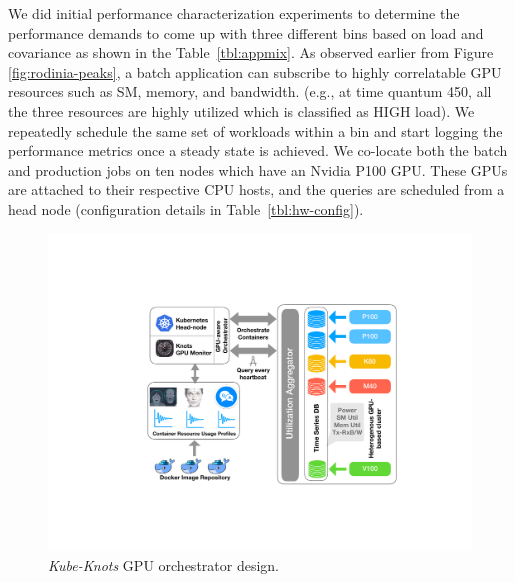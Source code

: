 We did initial performance characterization experiments to determine the performance demands to come up with three different bins based on load and covariance as shown in the Table~\ref{tbl:appmix}. As observed earlier from Figure \ref{fig:rodinia-peaks}, a batch application can subscribe to highly correlatable GPU resources such as SM, memory, and bandwidth. (e.g., at time quantum 450, all the three resources are highly utilized which is classified as HIGH load). We repeatedly schedule the same set of workloads within a bin and start logging the performance metrics once a steady state is achieved.  We co-locate both the batch and production jobs on ten nodes which have an Nvidia P100 GPU. These GPUs are attached to their respective CPU hosts, and the queries are scheduled from a head node (configuration details in Table~\ref{tbl:hw-config}).

\begin{figure}
  \centering
  \includegraphics[width=.99\linewidth]{results/kube-knots.pdf}
  \caption{\textit{Kube-Knots} GPU orchestrator design.}
  \label{fig:kubeknots}
\end{figure}


